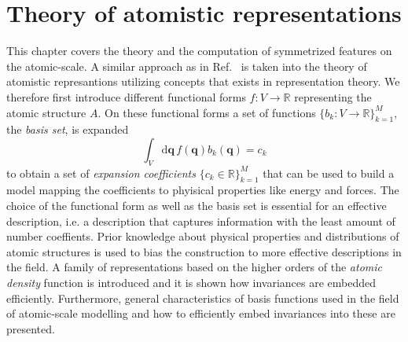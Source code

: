 \chapter{Theory of atomistic representations}
\label{sec:atomistic_representation}

This chapter covers the theory and the computation of symmetrized features on the atomic-scale.
A similar approach as in Ref.~\cite{willatt2019atom} is taken into the theory of atomistic represantions utilizing concepts that exists in representation theory.
We therefore first introduce different functional forms $f:V\rightarrow\mathbb{R}$ representing the atomic structure $A$.
On these functional forms a set of functions $\{b_k:V\rightarrow\mathbb{R}\}_{k=1}^{M}$, the \emph{basis set}, is expanded
\begin{equation}
  \int_V\mathrm{d}\mathbf{q}\, f(\mathbf{q})b_k(\mathbf{q}) = c_k
\end{equation}
to obtain a set of \emph{expansion coefficients} $\{c_k\in\mathbb{R}\}_{k=1}^{M}$ that can be used to build a model mapping the coefficients to phyisical properties like energy and forces.
The choice of the functional form as well as the basis set is essential for an effective description, i.e. a description that captures information with the least amount of number coeffients. 
Prior knowledge about physical properties and distributions of atomic structures is used to bias the construction to more effective descriptions in the field.
A family of representations based on the higher orders of the \emph{atomic density} function is introduced and it is shown how invariances are embedded efficiently.
Furthermore, general characteristics of basis functions used in the field of atomic-scale modelling and how to efficiently embed invariances into these are presented.
